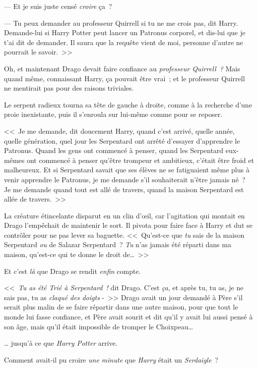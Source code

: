--- Et je suis juste censé \emph{croire} ça~?

--- Tu peux demander au professeur Quirrell si tu ne me crois pas, dit Harry. Demande-lui si Harry Potter peut lancer un Patronus corporel, et dis-lui que je t'ai dit de demander. Il saura que la requête vient de moi, personne d'autre ne pourrait le savoir.~>>

Oh, et maintenant Drago devait faire confiance au \emph{professeur Quirrell~?} Mais quand même, connaissant Harry, ça pouvait être vrai~; et le professeur Quirrell ne mentirait pas pour des raisons triviales.

Le serpent radieux tourna sa tête de gauche à droite, comme à la recherche d'une proie inexistante, puis il s'enroula sur lui-même comme pour se reposer.

<<~Je me demande, dit doucement Harry, quand c'est arrivé, quelle année, quelle génération, quel jour les Serpentard ont arrêté d'essayer d'apprendre le Patronus. Quand les gens ont commencé à penser, quand les Serpentard eux-mêmes ont commencé à penser qu'être trompeur et ambitieux, c'était être froid et malheureux. Et si Serpentard savait que ses élèves ne se fatiguaient même plus à venir apprendre le Patronus, je me demande s'il souhaiterait n'être jamais né~? Je me demande quand tout est allé de travers, quand la maison Serpentard est allée de travers.~>>

La créature étincelante disparut en un clin d'œil, car l'agitation qui montait en Drago l'empêchait de maintenir le sort. Il pivota pour faire face à Harry et dut se contrôler pour ne pas lever sa baguette. <<~Qu'est-ce que \emph{tu} sais de la maison Serpentard \emph{ou} de Salazar Serpentard~? \emph{Tu} n'as jamais été réparti dans ma maison, qu'est-ce qui te donne le droit de…~>>

Et c'est \emph{là} que Drago se rendit \emph{enfin} compte.

<<~\emph{Tu as été Trié à Serpentard~! } dit Drago. C'est \emph{ça}, et après tu, tu as, je ne sais pas, tu as \emph{claqué des doigts} -~>> Drago avait un jour demandé à Père s'il serait plus malin de se faire répartir dans une autre maison, pour que tout le monde lui fasse confiance, et Père avait sourit et dit qu'il y avait lui aussi pensé à son âge, mais qu'il était impossible de tromper le Choixpeau…

… jusqu'à ce que \emph{Harry Potter} arrive.

Comment avait-il pu croire \emph{une minute} que \emph{Harry} était un \emph{Serdaigle}~?

